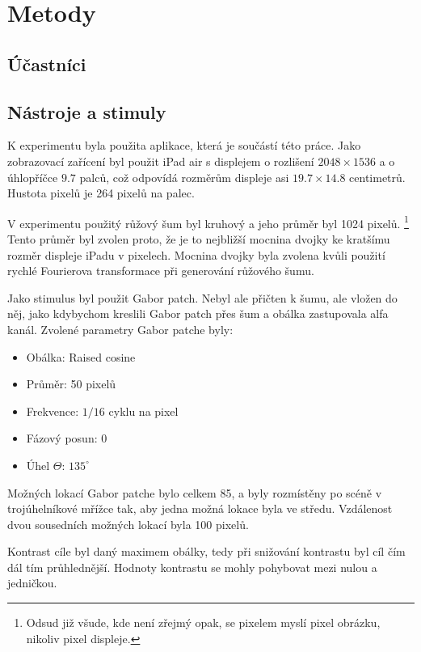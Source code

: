\chapter{Metody}


\section{Účastníci}

\section{Nástroje a stimuly}

K experimentu byla použita aplikace, která je součástí této práce. 
Jako zobrazovací zařícení byl použit iPad air s displejem o rozlišení
$2048\times1536$ a o úhlopříčce $9.7$ palců, což odpovídá rozměrům displeje asi
$19.7 \times 14.8$ centimetrů. Hustota pixelů je 264 pixelů na palec. 

V experimentu použitý růžový šum byl kruhový a jeho průměr byl 1024 pixelů.
\footnote{Odsud již všude, kde není zřejmý opak, se pixelem myslí
pixel obrázku, nikoliv pixel displeje.} Tento průměr byl zvolen proto, že je
to nejbližší mocnina dvojky ke kratšímu rozměr displeje iPadu v pixelech.
Mocnina dvojky byla zvolena kvůli použití rychlé Fourierova transformace při
generování růžového šumu.

Jako stimulus byl použit Gabor patch. Nebyl ale přičten k
šumu, ale vložen do něj, jako kdybychom kreslili Gabor patch přes šum a obálka
zastupovala alfa kanál.  Zvolené parametry Gabor patche byly:

\begin{itemize}
\item Obálka: Raised cosine
\item Průměr: 50 pixelů
\item Frekvence: $1/16$ cyklu na pixel
\item Fázový posun: 0
\item Úhel $\Theta$: $135^\circ$ 
\end{itemize}

Možných lokací Gabor patche bylo celkem 85, a byly rozmístěny po scéně v
trojúhelníkové mřížce tak, aby jedna možná lokace byla ve středu. Vzdálenost
dvou sousedních možných lokací byla 100 pixelů. 

Kontrast cíle byl daný maximem obálky, tedy při snižování kontrastu byl cíl čím dál tím průhlednější. Hodnoty kontrastu se mohly pohybovat mezi nulou a jedničkou.

